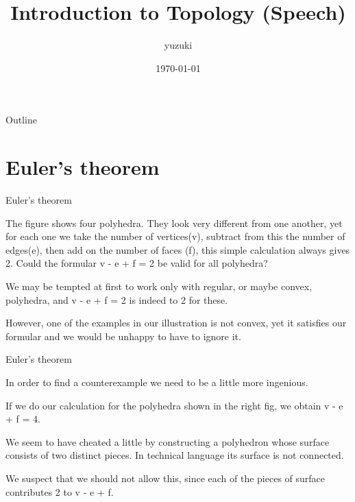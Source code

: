 \documentclass{beamer}
\title{Introduction to Topology (Speech)}
\author{yuzuki}
\institute{Eyes, Japan}
\date{\today}
\begin{document}
\begin{frame}
  \titlepage
\end{frame}

\begin{frame}{Outline}
  \tableofcontents
\end{frame}


\section{Euler's theorem}

\begin{frame}{Euler's theorem}
  \begin{block}{}
    The figure shows four polyhedra. They look very different from one another, yet for each one we take the number of vertices(v), subtract from this the number of edges(e), then add on the number of faces (f), this simple calculation always gives 2. Could the formular v - e + f = 2 be valid for all polyhedra?
  \end{block}
  \begin{block}{}
    We may be tempted at first to work only with regular, or maybe convex, polyhedra, and v - e + f = 2 is indeed to 2 for these.
  \end{block}
  \begin{block}{}
    However, one of the examples in our illustration is not convex, yet it satisfies our formular and we would be unhappy to have to ignore it.
  \end{block}
\end{frame}

\begin{frame}{Euler's theorem}
  \begin{block}{}
    In order to find a counterexample we need to be a little more ingenious.
  \end{block}
  \begin{block}{}
    If we do our calculation for the polyhedra shown in the right fig, we obtain v - e + f = 4.
  \end{block}
  \begin{block}{}
    We seem to have cheated a little by constructing a polyhedron whose surface consists of two distinct pieces. In technical language its surface is not connected.
  \end{block}
  \begin{block}{}
    We suspect that we should not allow this, since each of the pieces of surface contributes 2 to v - e + f.
  \end{block}
\end{frame}
\end{document}
